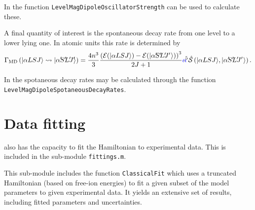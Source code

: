 \documentclass{article}
\newcommand{\codetext}[1]{{\color{BlueViolet} \texttt{#1}}}
\begin{document}
In \qlanth the function \codetext{LevelMagDipoleOscillatorStrength} can be used to calculate these.

 

A final quantity of interest is the spontaneous decay rate from one level to a lower lying one. In atomic units this rate is determined by
\begin{equation}
	\decayRate{MD}{\alpha{LSJ}}{\alpha\mathrlap{'}
			S\mathrlap{'}
			L\mathrlap{'}
			J\mathrlap{'}} = \frac{4 n^3}{3} 
			\frac{
				\left(
					\mathcal{E}(
						\ket{\alpha{LSJ}}) - 
					\mathcal{E}(
						\ket{\alpha\mathrlap{'}
							S\mathrlap{'}
							L\mathrlap{'}
							J\mathrlap{'}\,\,})
				\right)^3
				}
				{2J+1} 
		\alphaFine^5
		\lineStrength\left(\ket{\alpha{LSJ}},\ket{\alpha\mathrlap{'} S\mathrlap{'} L\mathrlap{'} J\mathrlap{'}\,\,}\right).
\end{equation}

In \qlanth the spotaneous decay rates may be calculated through the function \codetext{LevelMagDipoleSpotaneousDecayRates}.

 

\section{Data fitting}

\qlanth also has the capacity to fit the Hamiltonian to experimental data. This is included in the sub-module \codetext{fittings.m}.

This sub-module includes the function \codetext{ClassicalFit} which uses a truncated Hamiltonian (based on free-ion energies) to fit a given subset of the model parameters to given experimental data. It yields an extensive set of results, including fitted parameters and uncertainties.
\end{document}
